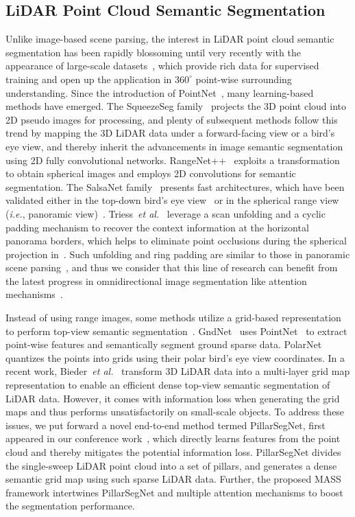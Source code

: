 \documentclass[lettersize,journal]{IEEEtran}
\begin{document}
\subsection{LiDAR Point Cloud Semantic Segmentation}
Unlike image-based scene parsing, the interest in LiDAR point cloud semantic segmentation has been rapidly blossoming until very recently with the appearance of large-scale datasets~\cite{semantic_kitti,nuscenes,semanticposs,semi_lidar}, which provide rich data for supervised training and open up the application in $360^\circ$ point-wise surrounding understanding.  
Since the introduction of PointNet~\cite{pointnet}, many learning-based methods have emerged.
The SqueezeSeg family~\cite{squeezeseg,squeezesegv2} projects the 3D point cloud into 2D pseudo images for processing, and plenty of subsequent methods follow this trend by mapping the 3D LiDAR data under a forward-facing view or a bird's eye view, and thereby inherit the advancements in image semantic segmentation using 2D fully convolutional networks.
RangeNet++~\cite{rangenet++} exploits a transformation to obtain spherical images and employs 2D convolutions for semantic segmentation.
The SalsaNet family~\cite{salsanet,salsanext} presents fast architectures, which have been validated either in the top-down bird's eye view~\cite{salsanet} or in the spherical range view (\textit{i.e.}, panoramic view)~\cite{salsanext}.  
Triess~\textit{et al.}~\cite{scan_based} leverage a scan unfolding and a cyclic padding mechanism to recover the context information at the horizontal panorama borders, which helps to eliminate point occlusions during the spherical projection in~\cite{rangenet++}.
Such unfolding and ring padding are similar to those in panoramic scene parsing~\cite{pass}, and thus we consider that this line of research can benefit from the latest progress in omnidirectional image segmentation like attention mechanisms~\cite{omnirange}.

Instead of using range images, some methods utilize a grid-based representation to perform top-view semantic segmentation~\cite{gndnet,bieder2020exploiting,semantic_grid_estimation,monocular_semantic_occupancy_grid_mapping,sparse_dense}. 
GndNet~\cite{gndnet} uses PointNet~\cite{pointnet} to extract point-wise features and semantically segment ground sparse data.
PolarNet~\cite{polarnet} quantizes the points into grids using their polar bird's eye view coordinates. 
In a recent work, Bieder~\textit{et al.}~\cite{bieder2020exploiting} transform 3D LiDAR data into a multi-layer grid map representation to enable an efficient dense top-view semantic segmentation of LiDAR data.
However, it comes with information loss when generating the grid maps and thus performs unsatisfactorily on small-scale objects.
To address these issues, we put forward a novel end-to-end method termed PillarSegNet, first appeared in our conference work~\cite{fei2021pillarsegnet}, which directly learns features from the point cloud and thereby mitigates the potential information loss. 
PillarSegNet divides the single-sweep LiDAR point cloud into a set of pillars, and generates a dense semantic grid map using such sparse LiDAR data.
Further, the proposed MASS framework intertwines PillarSegNet and multiple attention mechanisms to boost the segmentation performance.
\end{document}
